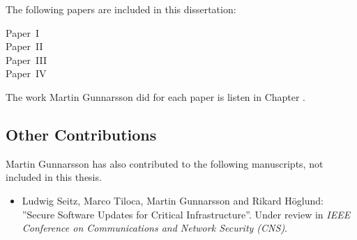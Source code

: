 The following papers are included in this dissertation:

\begin{description}
  \item[Paper~I]
    \paperIref
  \item[Paper~II]
    \paperIIref
  \item[Paper~III]
    \paperIIIref
  \item[Paper~IV]
    \paperIVref
\end{description}

\noindent
The work Martin Gunnarsson did for each paper is listen in Chapter .


\newpage
\subsection*{Other Contributions}

Martin Gunnarsson has also contributed to the following manuscripts, not included in this thesis.

\begin{itemize}
	\item Ludwig Seitz, Marco Tiloca, Martin Gunnarsson and Rikard Höglund:
	''Secure Software Updates for Critical Infrastructure''. Under review in \emph{IEEE Conference on Communications and Network Security (CNS)}.
\end{itemize}

